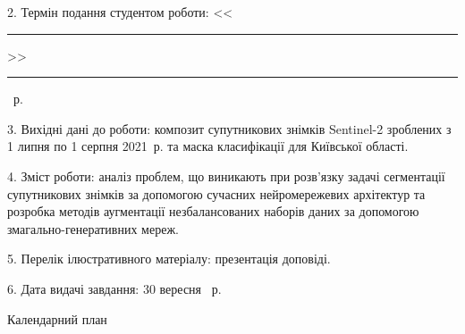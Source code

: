 2. Термін подання студентом роботи: <<\rule{0.5cm}{0.25pt}>> \rule{2.5cm}{0.25pt} \YearOfDefence~р.

3. Вихідні дані до роботи: композит супутникових
знімків Sentinel-2 зроблених з
1 липня по 1 серпня 2021~р. та маска
класифікації для Київської області.

4. Зміст роботи: аналіз проблем, що виникають при розв'язку
задачі сегментації супутникових знімків за допомогою сучасних
нейромережевих архітектур та розробка методів аугментації незбалансованих
наборів даних за допомогою змагально-генеративних мереж.

5. Перелік ілюстративного матеріалу: презентація доповіді.

6. Дата видачі завдання: 30 вересня \YearOfBeginning~р.

\newpage
\thispagestyle{empty}

\begin{center}
    Календарний план
\end{center}

